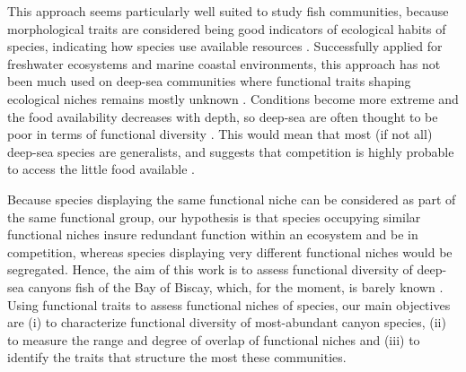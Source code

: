This approach seems particularly well suited to study fish communities, because morphological traits are considered being good indicators of ecological habits of species, indicating how species use available resources \citep{farre2016,winemiller1991}. Successfully applied for freshwater ecosystems and marine coastal environments, this approach has not been much used on deep-sea communities where functional traits shaping ecological niches remains mostly unknown \citep{aneeshkumar2017,farre2016}. Conditions become more extreme and the food availability decreases with depth, so deep-sea are often thought to be poor in terms of functional diversity \citep{aneeshkumar2017,mason2008,novotny2018}. This would mean that most (if not all) deep-sea species are generalists, and suggests that competition is highly probable to access the little food available .

Because species displaying the same functional niche can be considered as part of the same functional group, our hypothesis is that species occupying similar functional niches insure redundant function within an ecosystem and be in competition, whereas species displaying very different functional niches would be segregated. Hence, the aim of this work is to assess functional diversity of deep-sea canyons fish of the Bay of Biscay, which, for the moment, is barely known \citep{kenchington2020}. Using functional traits to assess functional niches of species, our main objectives are (i) to characterize functional diversity of most-abundant canyon species, (ii) to measure the range and degree of overlap of functional niches and (iii) to identify the traits that structure the most these communities.



